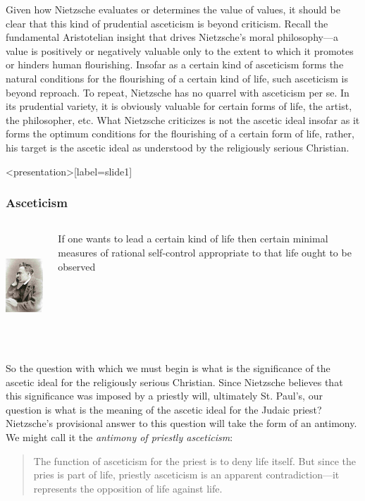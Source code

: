 Given how Nietzsche evaluates or determines the value of values, it should be clear that this kind of prudential asceticism is beyond criticism. Recall the fundamental Aristotelian insight that drives Nietzsche's moral philosophy---a value is positively or negatively valuable only to the extent to which it promotes or hinders human flourishing. Insofar as a certain kind of asceticism forms the natural conditions for the flourishing of a certain kind of life, such asceticism is beyond reproach. To repeat, Nietzsche has no quarrel with asceticism per se. In its prudential variety, it is obviously valuable for certain forms of life, the artist, the philosopher, etc. What Nietzsche criticizes is not the ascetic ideal insofar as it forms the optimum conditions for the flourishing of a certain form of life, rather, his target is the ascetic ideal as understood by the religiously serious Christian. \change

\begin{frame}<presentation>[label=slide1]
    \frametitle{Asceticism}
        \begin{columns}
            \begin{column}{3cm}
                \includegraphics[height=4cm]{../../../graphics/nietzsche.jpg}
            \end{column}
            \begin{column}{7cm}
                If one wants to lead a certain kind of life then certain minimal measures of rational self-control appropriate to that life ought to be observed
            \end{column}
        \end{columns}
\end{frame}

So the question with which we must begin is what is the significance of the ascetic ideal for the religiously serious Christian. Since Nietzsche believes that this significance was imposed by a priestly will, ultimately St. Paul's, our question is what is the meaning of the ascetic ideal for the Judaic priest? Nietzsche's provisional answer to this question will take the form of an antimony. We might call it the \emph{antimony of priestly asceticism}:
\begin{quote}
    The function of asceticism for the priest is to deny life itself. But since the pries is part of life, priestly asceticism is an apparent contradiction---it represents the opposition of life against life.
\end{quote}

